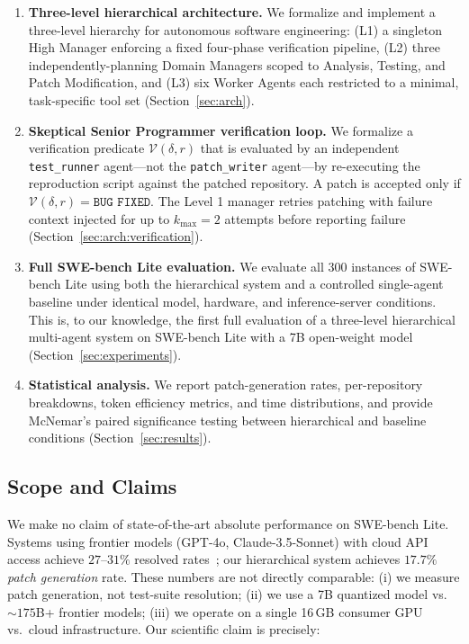 \documentclass[letterpaper]{aaai25}  %
\newcommand{\patch}{\delta}        %
\newcommand{\verify}{\mathcal{V}}  %
\begin{document}
\begin{enumerate}

  \item \textbf{Three-level hierarchical architecture.} We formalize and
  implement a three-level hierarchy for autonomous software engineering:
  (L1) a singleton High Manager enforcing a fixed four-phase verification
  pipeline, (L2) three independently-planning Domain Managers scoped to
  Analysis, Testing, and Patch Modification, and (L3) six Worker Agents each
  restricted to a minimal, task-specific tool set (Section~\ref{sec:arch}).

  \item \textbf{Skeptical Senior Programmer verification loop.} We formalize
  a verification predicate $\verify(\patch, r)$ that is evaluated by an
  independent \texttt{test\_runner} agent---not the \texttt{patch\_writer}
  agent---by re-executing the reproduction script against the patched
  repository. A patch is accepted only if $\verify(\patch, r) = \texttt{BUG FIXED}$.
  The Level 1 manager retries patching with failure context injected for
  up to $k_{\max} = 2$ attempts before reporting failure
  (Section~\ref{sec:arch:verification}).

  \item \textbf{Full SWE-bench Lite evaluation.} We evaluate all 300
  instances of SWE-bench Lite using both the hierarchical system and a
  controlled single-agent baseline under identical model, hardware, and
  inference-server conditions. This is, to our knowledge, the first full
  evaluation of a three-level hierarchical multi-agent system on SWE-bench
  Lite with a 7B open-weight model (Section~\ref{sec:experiments}).

  \item \textbf{Statistical analysis.} We report patch-generation rates,
  per-repository breakdowns, token efficiency metrics, and time distributions,
  and provide McNemar's paired significance testing between hierarchical and
  baseline conditions (Section~\ref{sec:results}).

\end{enumerate}

\subsection{Scope and Claims}
\label{sec:intro:scope}

We make no claim of state-of-the-art absolute performance on SWE-bench Lite.
Systems using frontier models (GPT-4o, Claude-3.5-Sonnet) with cloud API
access achieve $27$--$31\%$ resolved rates~\cite{yang2024sweagent,
zhang2024autocoderover,xia2024agentless,wang2024opendevin}; our hierarchical
system achieves $17.7\%$ \emph{patch generation} rate. These numbers are
not directly comparable: (i) we measure patch generation, not test-suite
resolution; (ii) we use a 7B quantized model vs.\ $\sim$$175$B+ frontier
models; (iii) we operate on a single 16\,GB consumer GPU vs.\ cloud
infrastructure. Our scientific claim is precisely:
\end{document}
